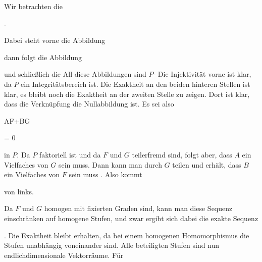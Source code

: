 {


Wir betrachten die


 { . }


Dabei steht vorne die Abbildung

 dann folgt die Abbildung

 und schließlich die
All diese Abbildungen sind
$P$-
Die Injektivität vorne ist klar, da $P$ ein Integritätsbereich ist. Die Exaktheit an den beiden hinteren Stellen ist klar, es bleibt noch die Exaktheit an der zweiten Stelle zu zeigen. Dort ist klar, dass die Verknüpfung die Nullabbildung ist. Es sei also


\mavergleichskette

{\vergleichskette

{ AF+BG
}

{ = }{ 0
}

{  }{
}

{    }{
}

{   }{
}

}
{}{}{}
in $P$. Da $P$ faktoriell ist und da $F$ und $G$ teilerfremd sind, folgt aber, dass $A$ ein Vielfaches von $G$ sein muss. Dann kann man durch $G$ teilen und erhält, dass $B$ ein Vielfaches von $F$ sein muss
 {} {.}
Also kommt

 von links.


Da $F$ und $G$ homogen mit fixierten Graden sind, kann man diese Sequenz einschränken auf homogene Stufen, und zwar ergibt sich dabei die exakte Sequenz


 {  }


 {} {.}
Die Exaktheit bleibt erhalten, da bei einem homogenen Homomorphismus die Stufen unabhängig voneinander sind. Alle beteiligten Stufen sind nun endlichdimensionale Vektorräume. Für


}
